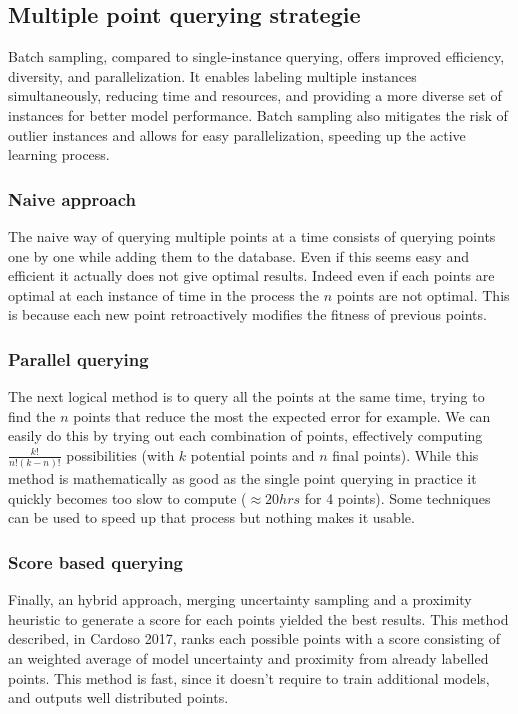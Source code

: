 \documentclass[10pt]{article}
\begin{document}
\begin{multicols}{2}
\subsection{Multiple point querying strategie}

Batch sampling, compared to single-instance querying, offers improved efficiency, diversity, and parallelization. It enables labeling multiple instances simultaneously, reducing time and resources, and providing a more diverse set of instances for better model performance. Batch sampling also mitigates the risk of outlier instances and allows for easy parallelization, speeding up the active learning process.

\subsubsection*{Naive approach}
The naive way of querying multiple points at a time consists of querying points one by one while adding them to the database. Even if this seems easy and efficient it actually does not give optimal results. Indeed even if each points are optimal at each instance of time in the process the $n$ points are not optimal. This is because each new point retroactively modifies the fitness of previous points.

\subsubsection*{Parallel querying}
The next logical method is to query all the points at the same time, trying to find the $n$ points that reduce the most the expected error for example. We can easily do this by trying out each combination of points, effectively computing $\frac{k!}{n! (k-n)!}$ possibilities (with $k$ potential points and $n$ final points). While this method is mathematically as good as the single point querying in practice it quickly becomes too slow to compute ($\approx 20hrs$ for 4 points). Some techniques can be used to speed up that process but nothing makes it usable.

\subsubsection*{Score based querying}

Finally, an hybrid approach, merging uncertainty sampling and a proximity heuristic to generate a score for each points yielded the best results. This method described, in Cardoso 2017\cite{cardoso_ranked_2017}, ranks each possible points with a score consisting of an weighted average of model uncertainty and proximity from already labelled points. This method is fast, since it doesn't require to train additional models, and outputs well distributed points.



\end{multicols}
\end{document}
